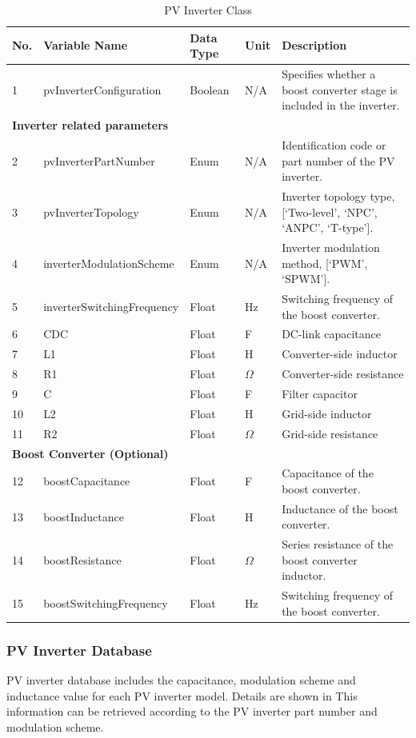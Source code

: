\documentclass{article}
\begin{document}
\begin{table}[h]
\centering
\caption{PV Inverter Class}
\begin{tabular}{|l|p{4cm}|l|l|p{5cm}|}
\hline
\textbf{No.} & \textbf{Variable Name} & \textbf{Data Type} & \textbf{Unit} & \textbf{Description} \\ \hline
1 & pvInverterConfiguration & Boolean & N/A & Specifies whether a boost converter stage is included in the inverter. \\ \hline
\multicolumn{5}{|l|}{\textbf{Inverter related parameters}} \\ \hline
2 & pvInverterPartNumber & Enum & N/A & Identification code or part number of the PV inverter. \\ \hline
3 & pvInverterTopology & Enum & N/A & Inverter topology type, [`Two-level', `NPC', `ANPC', `T-type']. \\ \hline
4 & inverterModulationScheme & Enum & N/A & Inverter modulation method, [`PWM', `SPWM']. \\ \hline
5 & inverterSwitchingFrequency & Float & Hz & Switching frequency of the boost converter. \\ \hline
6 & CDC & Float & F & DC-link capacitance \\ \hline
7 & L1 & Float & H & Converter-side inductor \\ \hline
8 & R1 & Float & $\Omega$ & Converter-side resistance \\ \hline
9 & C & Float & F & Filter capacitor \\ \hline
10 & L2 & Float & H & Grid-side inductor \\ \hline
11 & R2 & Float & $\Omega$ & Grid-side resistance \\ \hline
\multicolumn{5}{|l|}{\textbf{Boost Converter (Optional)}} \\ \hline
12 & boostCapacitance & Float & F & Capacitance of the boost converter. \\ \hline
13 & boostInductance & Float & H & Inductance of the boost converter. \\ \hline
14 & boostResistance & Float & $\Omega$ & Series resistance of the boost converter inductor. \\ \hline
15 & boostSwitchingFrequency & Float & Hz & Switching frequency of the boost converter. \\ \hline
\end{tabular}
\end{table}

\subsubsection{PV Inverter Database}
PV inverter database includes the capacitance, modulation scheme and inductance value for each PV inverter model. Details are shown in This information can be retrieved according to the PV inverter part number and modulation scheme.
\end{document}
